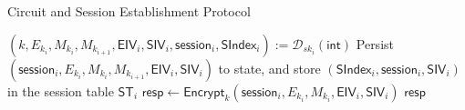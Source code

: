 \begin{algorithm*}[ht!]
  \caption{Circuit and Session Establishment Protocol}
  \begin{algorithmic}[1]



\medskip

  \State $(k, E_{k_i}, M_{k_i}, M_{k_{i+1}}, \mathsf{EIV}_i, \mathsf{SIV}_i, \mathsf{session}_i, \mathsf{SIndex}_i) := \mathcal{D}_{sk_i}(\mathsf{int})$
  \State Persist $(\mathsf{session}_i, E_{k_i}, M_{k_i}, M_{k_{i+1}}, \mathsf{EIV}_i, \mathsf{SIV}_i)$ to state, and store $(\mathsf{SIndex}_i, \mathsf{session}_i, \mathsf{SIV}_i)$ in the session table $\mathsf{ST}_i$
  \State $\mathsf{resp} \gets \mathsf{Encrypt}_{k}(\mathsf{session}_i, E_{k_i}, M_{k_i}, \mathsf{EIV}_i, \mathsf{SIV}_i)$
  \State \Return $\mathsf{resp}$
  
\EndFunction


\end{algorithmic}
\end{algorithm*}
